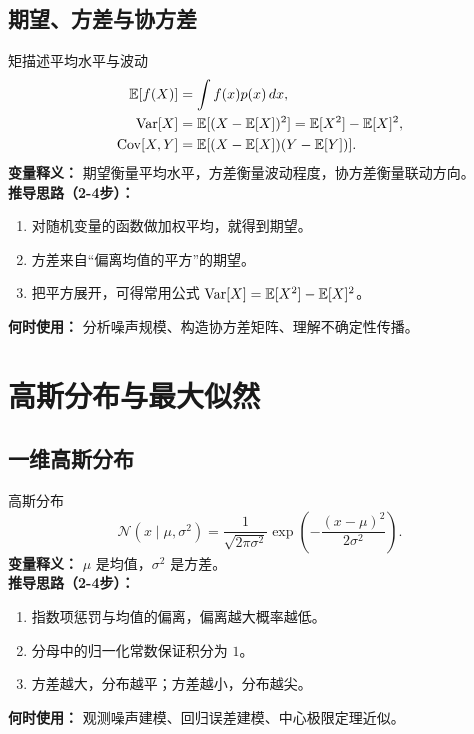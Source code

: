 \documentclass[11pt]{article}
\begin{document}
\subsection{期望、方差与协方差}
\begin{formulabox}{矩描述平均水平与波动}
\begin{align}
\mathbb{E}[f(X)] &= \int f(x)p(x)\,dx, \\
\mathrm{Var}[X] &= \mathbb{E}[(X-\mathbb{E}[X])^2] = \mathbb{E}[X^2]-\mathbb{E}[X]^2,\\
\mathrm{Cov}[X,Y] &= \mathbb{E}[(X-\mathbb{E}[X])(Y-\mathbb{E}[Y])].
\end{align}
\textbf{变量释义：} 期望衡量平均水平，方差衡量波动程度，协方差衡量联动方向。\\
\textbf{推导思路（2-4步）：}
\begin{enumerate}[leftmargin=1.6em]
  \item 对随机变量的函数做加权平均，就得到期望。
  \item 方差来自“偏离均值的平方”的期望。
  \item 把平方展开，可得常用公式 $\mathrm{Var}[X]=\mathbb{E}[X^2]-\mathbb{E}[X]^2$。
\end{enumerate}
\textbf{何时使用：} 分析噪声规模、构造协方差矩阵、理解不确定性传播。
\end{formulabox}

\section{高斯分布与最大似然}
\subsection{一维高斯分布}
\begin{formulabox}{高斯分布}
\begin{equation}
\mathcal{N}(x\mid\mu,\sigma^2)=\frac{1}{\sqrt{2\pi\sigma^2}}
\exp\left(-\frac{(x-\mu)^2}{2\sigma^2}\right).
\end{equation}
\textbf{变量释义：} $\mu$ 是均值，$\sigma^2$ 是方差。\\
\textbf{推导思路（2-4步）：}
\begin{enumerate}[leftmargin=1.6em]
  \item 指数项惩罚与均值的偏离，偏离越大概率越低。
  \item 分母中的归一化常数保证积分为 $1$。
  \item 方差越大，分布越平；方差越小，分布越尖。
\end{enumerate}
\textbf{何时使用：} 观测噪声建模、回归误差建模、中心极限定理近似。
\end{formulabox}
\end{document}
